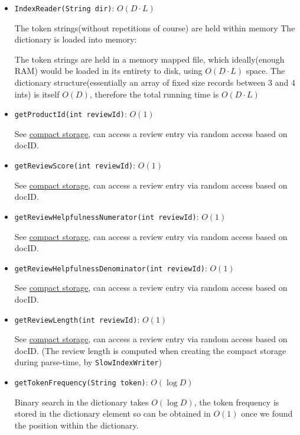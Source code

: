 \documentclass[11pt]{article}
\begin{document}
\begin{itemize}
    \item \verb+IndexReader(String dir)+: $O(D\cdot L)$
    
    The token strings(without repetitions of course) are held within memory
    The dictionary is loaded into memory:
    
    The token strings are held in a memory mapped file, which ideally(enough RAM) would be loaded in its entirety to disk, using $O(D\cdot L)$ space.
    The dictionary structure(essentially an array of fixed size records between 3
    and 4 ints) is itself $O(D)$, therefore the total running time is $O(D\cdot L)$

    \item \verb+getProductId(int reviewId)+: $O(1)$
    
    See \hyperref[sec:compactStorage] {compact storage}, can access a review entry via random access based on docID.

	\item \verb+getReviewScore(int reviewId)+: $O(1)$
	
	See \hyperref[sec:compactStorage] {compact storage}, can access a review entry via random access based on docID.	

	\item \verb+getReviewHelpfulnessNumerator(int reviewId)+: $O(1)$
    
    See \hyperref[sec:compactStorage] {compact storage}, can access a review entry via random access based on docID.

   \item \verb+getReviewHelpfulnessDenominator(int reviewId)+: $O(1)$

    See \hyperref[sec:compactStorage] {compact storage}, can access a review entry via random access based on docID.

   \item \verb+getReviewLength(int reviewId)+: $O(1)$

    See \hyperref[sec:compactStorage] {compact storage}, can access a review entry via random access based on docID.
    (The review length is computed when creating the compact storage during parse-time, by \verb+SlowIndexWriter+)

	\item \verb+getTokenFrequency(String token)+: $O(\log D)$
	
	Binary search in the dictionary takes $O(\log D)$, the token frequency is stored in the dictionary
	element so can be obtained in $O(1)$ once we found the position within the dictionary.
    

\end{itemize}
\end{document}
